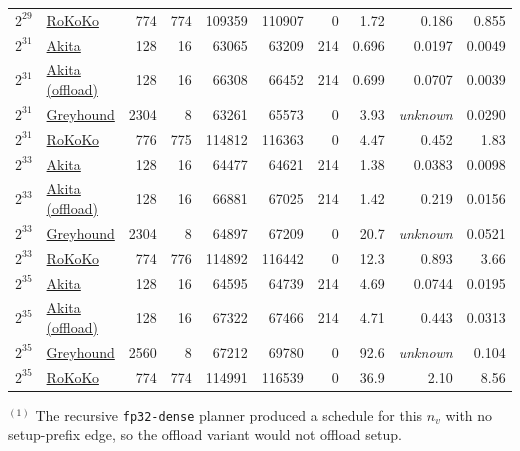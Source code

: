 \begin{table}[H]
\begin{tabular}{@{}llrrrrrrrr@{}}
$2^{29}$ & \href{https://github.com/lattice-arguments/rokoko/commit/26d07c73c54872b9e8d2b3200117a6a0a21b10ee}{RoKoKo} & 774 & 774 & 109359 & 110907 & 0 & 1.72 & 0.186 & 0.855 \\
\addlinespace
$2^{31}$ & \href{https://github.com/LayerZero-Labs/akita/commit/c0cb822f28b7b9efe85b1924b029d36e13cdf516}{Akita} & 128 & 16 & 63065 & 63209 & 214 & 0.696 & 0.0197 & 0.0049 \\
$2^{31}$ & \href{https://github.com/LayerZero-Labs/akita/commit/c0cb822f28b7b9efe85b1924b029d36e13cdf516}{Akita (offload)} & 128 & 16 & 66308 & 66452 & 214 & 0.699 & 0.0707 & 0.0039 \\
$2^{31}$ & \href{https://github.com/LayerZero-Labs/greyhound-reference/commit/672e74100496f6ef698ba35e241cf7593e3d57af}{Greyhound} & 2304 & 8 & 63261 & 65573 & 0 & 3.93 & \textit{unknown} & 0.0290 \\
$2^{31}$ & \href{https://github.com/lattice-arguments/rokoko/commit/26d07c73c54872b9e8d2b3200117a6a0a21b10ee}{RoKoKo} & 776 & 775 & 114812 & 116363 & 0 & 4.47 & 0.452 & 1.83 \\
\addlinespace
$2^{33}$ & \href{https://github.com/LayerZero-Labs/akita/commit/c0cb822f28b7b9efe85b1924b029d36e13cdf516}{Akita} & 128 & 16 & 64477 & 64621 & 214 & 1.38 & 0.0383 & 0.0098 \\
$2^{33}$ & \href{https://github.com/LayerZero-Labs/akita/commit/c0cb822f28b7b9efe85b1924b029d36e13cdf516}{Akita (offload)} & 128 & 16 & 66881 & 67025 & 214 & 1.42 & 0.219 & 0.0156 \\
$2^{33}$ & \href{https://github.com/LayerZero-Labs/greyhound-reference/commit/672e74100496f6ef698ba35e241cf7593e3d57af}{Greyhound} & 2304 & 8 & 64897 & 67209 & 0 & 20.7 & \textit{unknown} & 0.0521 \\
$2^{33}$ & \href{https://github.com/lattice-arguments/rokoko/commit/26d07c73c54872b9e8d2b3200117a6a0a21b10ee}{RoKoKo} & 774 & 776 & 114892 & 116442 & 0 & 12.3 & 0.893 & 3.66 \\
\addlinespace
$2^{35}$ & \href{https://github.com/LayerZero-Labs/akita/commit/c0cb822f28b7b9efe85b1924b029d36e13cdf516}{Akita} & 128 & 16 & 64595 & 64739 & 214 & 4.69 & 0.0744 & 0.0195 \\
$2^{35}$ & \href{https://github.com/LayerZero-Labs/akita/commit/c0cb822f28b7b9efe85b1924b029d36e13cdf516}{Akita (offload)} & 128 & 16 & 67322 & 67466 & 214 & 4.71 & 0.443 & 0.0313 \\
$2^{35}$ & \href{https://github.com/LayerZero-Labs/greyhound-reference/commit/672e74100496f6ef698ba35e241cf7593e3d57af}{Greyhound} & 2560 & 8 & 67212 & 69780 & 0 & 92.6 & \textit{unknown} & 0.104 \\
$2^{35}$ & \href{https://github.com/lattice-arguments/rokoko/commit/26d07c73c54872b9e8d2b3200117a6a0a21b10ee}{RoKoKo} & 774 & 774 & 114991 & 116539 & 0 & 36.9 & 2.10 & 8.56 \\
\bottomrule
\end{tabular}
\smallskip
{\footnotesize
\noindent$^{(1)}$ The recursive \texttt{fp32-dense} planner produced a schedule for this $n_v$ with no setup-prefix edge, so the offload variant would not offload setup.\\
}
\end{table}


